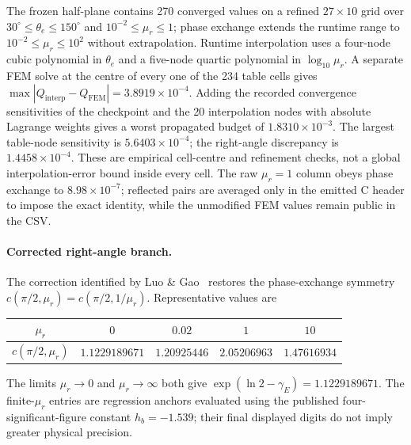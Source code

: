 \documentclass[11pt,a4paper]{article}
\newcommand{\mur}{\mu_r}
\begin{document}
The frozen half-plane contains 270 converged values on a refined
$27\times10$ grid over $30^\circ\leq\theta_e\leq150^\circ$ and
$10^{-2}\leq\mur\leq1$; phase exchange extends the runtime range to
$10^{-2}\leq\mur\leq10^2$ without extrapolation. Runtime interpolation uses a four-node cubic polynomial in
$\theta_e$ and a five-node quartic polynomial in $\log_{10}\mur$. A separate
FEM solve at the centre of every one of the 234 table cells gives
$\max|Q_{\mathrm{interp}}-Q_{\mathrm{FEM}}|=3.8919\times10^{-4}$.
Adding the recorded convergence sensitivities of the checkpoint and the 20
interpolation nodes with absolute Lagrange weights gives a worst propagated
budget of $1.8310\times10^{-3}$. The largest table-node sensitivity is
$5.6403\times10^{-4}$; the right-angle discrepancy is
$1.4458\times10^{-4}$. These are empirical cell-centre and refinement checks,
not a global interpolation-error bound inside every cell. The raw $\mur=1$
column obeys phase exchange to $8.98\times10^{-7}$; reflected pairs are
averaged only in the emitted C header to impose the exact identity, while the
unmodified FEM values remain public in the CSV.

\paragraph{Corrected right-angle branch.}
The correction identified by Luo \& Gao~\cite{luo2025} restores the
phase-exchange symmetry
$c(\pi/2,\mur)=c(\pi/2,1/\mur)$. Representative values are
\begin{center}
\begin{tabular}{ccccc}
  \toprule
  $\mur$ & $0$ & $0.02$ & $1$ & $10$ \\
  \midrule
  $c(\pi/2,\mur)$ & $1.1229189671$ & $1.20925446$ & $2.05206963$
    & $1.47616934$ \\
  \bottomrule
\end{tabular}
\end{center}
The limits $\mur\to0$ and $\mur\to\infty$ both give
$\exp(\ln2-\gamma_E)=1.1229189671$. The finite-$\mur$ entries are regression
anchors evaluated using the published four-significant-figure constant
$h_b=-1.539$; their final displayed digits do not imply greater physical
precision.
\end{document}
